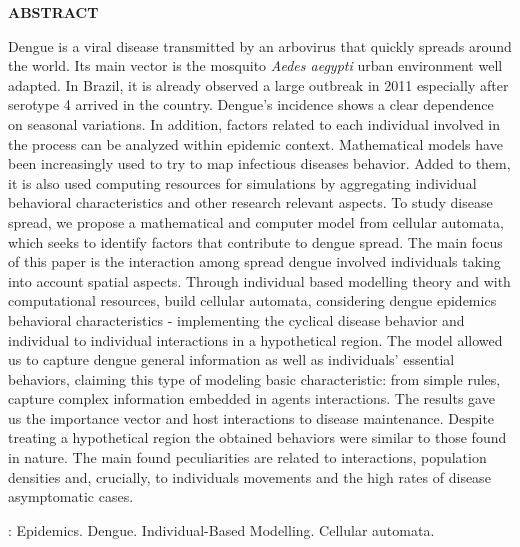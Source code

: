 \newpage
\thispagestyle{empty}
\vspace{1.5cm}
\begin{center}
{\large{\textbf{ABSTRACT}}}
\end{center}
\vspace{0.5cm}
\begin{spacing}{1.0}
\noindent Dengue is a viral disease transmitted by an arbovirus that quickly spreads around the world. Its main vector is the mosquito \emph{Aedes aegypti} urban environment well adapted. In Brazil, it is already observed a large outbreak in 2011 especially after serotype 4 arrived in the country. Dengue's incidence shows a clear dependence on seasonal variations. In addition, factors related to each individual involved in the process can be analyzed within epidemic context. Mathematical models have been increasingly used to try to map infectious diseases behavior. Added to them, it is also used computing resources for simulations by aggregating individual behavioral characteristics and other research relevant aspects. To study disease spread, we propose a mathematical and computer model from cellular automata, which seeks to identify factors that contribute to dengue spread. The main focus of this paper is the interaction among spread dengue involved individuals taking into account spatial aspects. Through individual based modelling theory and with computational resources, build cellular automata, considering dengue epidemics behavioral characteristics - implementing the cyclical disease behavior and individual to individual interactions in a hypothetical region. The model allowed us to capture dengue general information as well as individuals' essential behaviors, claiming this type of modeling basic characteristic: from simple rules, capture complex information embedded in agents interactions. The results gave us the importance vector and host interactions to disease maintenance. Despite treating a hypothetical region the obtained behaviors were similar to those found in nature. The main found peculiarities are related to interactions, population densities and, crucially, to individuals movements and the high rates of disease asymptomatic cases.

\end{spacing}

\vspace{1.5ex}

: Epidemics. Dengue. Individual-Based Modelling. Cellular automata.


